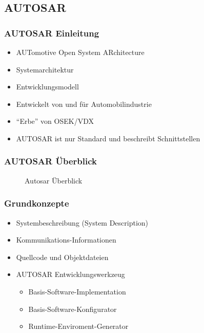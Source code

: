 \documentclass[]{beamer}
\newcommand{\inputImage}[1]{}
\begin{document}
\subsection{AUTOSAR}

\begin{frame}
\frametitle{AUTOSAR Einleitung}
    \begin{itemize}
        \item AUTomotive Open System ARchitecture
        \item Systemarchitektur
        \item Entwicklungsmodell
        \item Entwickelt von und für Automobilindustrie
        \item "`Erbe"' von OSEK/VDX
        \item AUTOSAR ist nur Standard und beschreibt Schnittstellen
    \end{itemize}
\end{frame}

\begin{frame}[plain] %
\frametitle{AUTOSAR Überblick}
    \begin{figure}[p]
        \centering
        \resizebox{0.6\linewidth}{!}{\inputImage{autosar_overview.dia}}
        \caption{Autosar Überblick}
        \label{fig:autosar_overview}
    \end{figure}
\end{frame}

\begin{frame}
\frametitle{Grundkonzepte}
    \begin{itemize}
        \item Systembeschreibung (System Description)
        \item Kommunikations-Informationen
        \item Quellcode und Objektdateien
        \item AUTOSAR Entwicklungswerkzeug
        \begin{itemize}
            \item Basis-Software-Implementation
            \item Basis-Software-Konfigurator
            \item Runtime-Enviroment-Generator
        \end{itemize}
    \end{itemize}
\end{frame}
\end{document}
